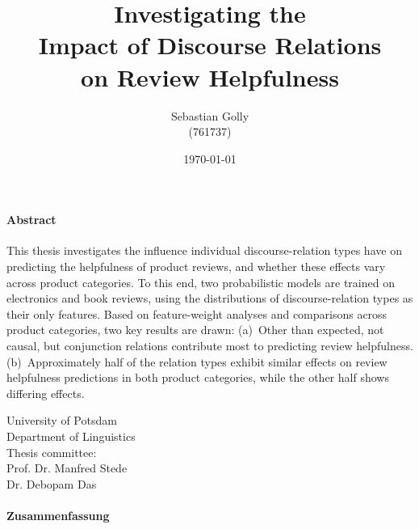 \documentclass[
    a4paper,%
    12pt,%
    oneside,%
    toc=bibliography,
    final,
]{scrartcl}
\title{Investigating the \\Impact of Discourse Relations\\ on Review Helpfulness}
\subtitle{}
\author{Sebastian Golly\\ {\normalsize (761737)}}
\date{\today}
\begin{document}
\maketitle

\vfill

\paragraph{Abstract}
This thesis investigates the influence individual discourse-relation types have on predicting the helpfulness of product reviews, and whether these effects vary across product categories. To this end, two probabilistic models are trained on electronics and book reviews, using the distributions of discourse-relation types as their only features. Based on feature-weight analyses and comparisons across product categories, two key results are drawn: (a)~Other than expected, not causal, but conjunction relations contribute most to predicting review helpfulness. (b)~Approximately half of the relation types exhibit similar effects on review helpfulness predictions in both product categories, while the other half shows differing effects.
\\[3em]

\vfill

\begin{center}
University of Potsdam\\[1em]
Department of Linguistics\\[1em]
Thesis committee:\\
Prof. Dr. Manfred Stede\\
Dr. Debopam Das
\end{center}

\thispagestyle{empty}
\newpage


\vspace*{\fill}

\paragraph{Zusammenfassung}
\end{document}

